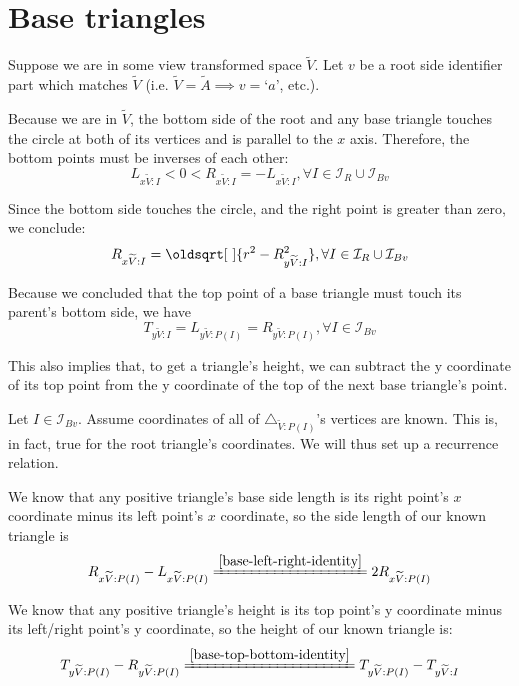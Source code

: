 \documentclass[a4paper,12pt]{article}
\newcommand{\HSindexpart}[1]{\text{`}#1\text{'}}
\newcommand{\HSview}[1][V]{\widetilde{#1}}
\newcommand{\HStriangle}[1][I]{\triangle_{\HSview:#1}}
\newcommand{\HSLx}[1][I]{L_{x\HSview:#1}}
\newcommand{\HSRx}[1][I]{R_{x\HSview:#1}}
\newcommand{\HSTy}[1][I]{T_{y\HSview:#1}}
\newcommand{\HSLy}[1][I]{L_{y\HSview:#1}}
\newcommand{\HSRy}[1][I]{R_{y\HSview:#1}}
\renewcommand*{\sqrt}[2][\ ]{\oldsqrt[#1]{#2} }
\theoremstyle{definition}
\theoremstyle{plain}
\begin{document}
	\newpage

	\section{Base triangles}
	
	Suppose we are in some view transformed space $\HSview$.
	Let $v$ be a root side identifier part which matches $\HSview$ (i.e. $\HSview = \widetilde{A} \implies v = \HSindexpart{a}$, etc.).

	Because we are in $\HSview$, the bottom side of the root and any base triangle touches the circle at both of its vertices and is parallel to the $x$ axis.
	Therefore, the bottom points must be inverses of each other:
	\begin{equation}
		\HSLx < 0 < \HSRx = -\HSLx, \forall I \in \mathcal{I}_R \cup \mathcal{I}_{Bv} \label{base-left-right-identity}
	\end{equation}

	Since the bottom side touches the circle, and the right point is greater than zero, we conclude:
	\begin{equation}
		\HSRx = \sqrt{r^2 - \HSRy^2}, \forall I \in \mathcal{I}_R \cup \mathcal{I}_{Bv} \label{base-bottom-circle-identity}
	\end{equation}

	Because we concluded that the top point of a base triangle must touch its parent's bottom side, we have
	\begin{equation}
		\HSTy = \HSLy[P(I)] = \HSRy[P(I)], \forall I \in \mathcal{I}_{Bv} \label{base-top-bottom-identity}
	\end{equation}

	This also implies that, to get a triangle's height, we can subtract the y coordinate of its top point from the y coordinate of the top of the next base triangle's point.
	
	Let $I \in \mathcal{I}_{Bv}$. Assume coordinates of all of $\HStriangle[P(I)]$'s vertices are known. This is, in fact, true for the root triangle's coordinates. We will thus set up a recurrence relation.

	We know that any positive triangle's base side length is its right point's $x$ coordinate minus its left point's $x$ coordinate, so the side length of our known triangle is
	$$\HSRx[P(I)] - \HSLx[P(I)] \xlongequal{\eqref{base-left-right-identity}} 2\HSRx[P(I)]$$

	We know that any positive triangle's height is its top point's y coordinate minus its left/right point's y coordinate, so the height of our known triangle is:
	$$\HSTy[P(I)] - \HSRy[P(I)] \xlongequal{\eqref{base-top-bottom-identity}} \HSTy[P(I)] - \HSTy$$
\end{document}
